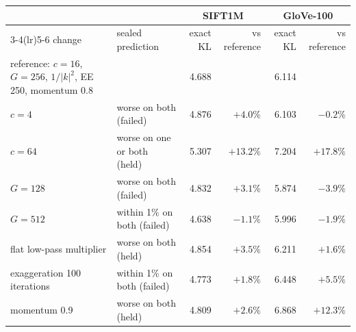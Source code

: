 \begin{tabular}{llrrrr}\toprule
 & & \multicolumn{2}{c}{SIFT1M} & \multicolumn{2}{c}{GloVe-100}\\
\cmidrule(lr){3-4}\cmidrule(lr){5-6}
change & sealed prediction & exact KL & vs reference & exact KL & vs reference\\\midrule
reference: $c=16$, $G=256$, $1/|k|^2$, EE 250, momentum 0.8 & & 4.688 & & 6.114 & \\
$c=4$ & worse on both (failed) & 4.876 & $+4.0\%$ & 6.103 & $-0.2\%$\\
$c=64$ & worse on one or both (held) & 5.307 & $+13.2\%$ & 7.204 & $+17.8\%$\\
$G=128$ & worse on both (failed) & 4.832 & $+3.1\%$ & 5.874 & $-3.9\%$\\
$G=512$ & within 1\% on both (failed) & 4.638 & $-1.1\%$ & 5.996 & $-1.9\%$\\
flat low-pass multiplier & worse on both (held) & 4.854 & $+3.5\%$ & 6.211 & $+1.6\%$\\
exaggeration 100 iterations & within 1\% on both (failed) & 4.773 & $+1.8\%$ & 6.448 & $+5.5\%$\\
momentum 0.9 & worse on both (held) & 4.809 & $+2.6\%$ & 6.868 & $+12.3\%$\\
\bottomrule\end{tabular}
